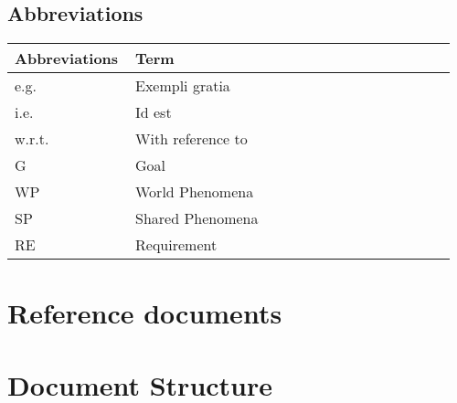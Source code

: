 \subsection{Abbreviations}
\begin{center}
	\begin{tabular}{@{}p{0.25\linewidth} p{0.71\linewidth}@{}}
		\toprule
		\textbf{Abbreviations} & \textbf{Term}\\
		\midrule
		e.g. & Exempli gratia\\
		i.e. & Id est\\
		w.r.t. & With reference to\\
		G & Goal\\
		WP & World Phenomena\\
		SP & Shared Phenomena\\
        RE & Requirement\\
		\bottomrule
	\end{tabular}
\end{center}

\section{Reference documents}

\section{Document Structure}
